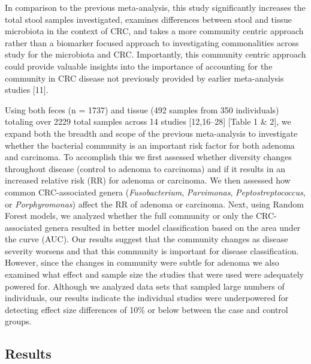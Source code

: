 \documentclass[12pt,]{article}
\begin{document}
In comparison to the previous meta-analysis, this study significantly
increases the total stool samples investigated, examines differences
between stool and tissue microbiota in the context of CRC, and takes a
more community centric approach rather than a biomarker focused approach
to investigating commonalities across study for the microbiota and CRC.
Importantly, this community centric approach could provide valuable
insights into the importance of accounting for the community in CRC
disease not previously provided by earlier meta-analysis studies
{[}11{]}.

Using both feces (n = 1737) and tissue (492 samples from 350
individuals) totaling over 2229 total samples across 14 studies
{[}12,16--28{]} {[}Table 1 \& 2{]}, we expand both the breadth and scope
of the previous meta-analysis to investigate whether the bacterial
community is an important risk factor for both adenoma and carcinoma. To
accomplish this we first assessed whether diversity changes throughout
disease (control to adenoma to carcinoma) and if it results in an
increased relative risk (RR) for adenoma or carcinoma. We then assessed
how common CRC-associated genera (\emph{Fusobacterium},
\emph{Parvimonas}, \emph{Peptostreptococcus}, or \emph{Porphyromonas})
affect the RR of adenoma or carcinoma. Next, using Random Forest models,
we analyzed whether the full community or only the CRC-associated genera
resulted in better model classification based on the area under the
curve (AUC). Our results suggest that the community changes as disease
severity worsens and that this community is important for disease
classification. However, since the changes in community were subtle for
adenoma we also examined what effect and sample size the studies that
were used were adequately powered for. Although we analyzed data sets
that sampled large numbers of individuals, our results indicate the
individual studies were underpowered for detecting effect size
differences of 10\% or below between the case and control groups.

\newpage

\subsection{Results}\label{results}
\end{document}
